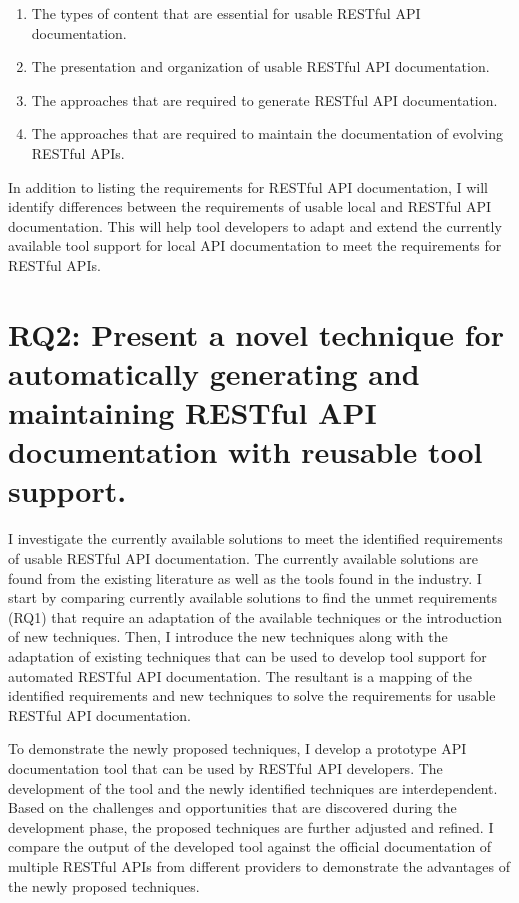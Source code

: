 \documentclass[11pt,oneside]{book}
\begin{document}
\begin{enumerate}
\item The types of content that are essential for usable RESTful API documentation.
\item The presentation and organization of usable RESTful API documentation.
\item The approaches that are required to generate RESTful API documentation.
\item The approaches that are required to maintain the documentation of evolving RESTful APIs.
\end{enumerate}

In addition to listing the requirements for RESTful API documentation, I will identify differences between the requirements of usable local and RESTful API documentation. This will help tool developers to adapt and extend the currently available tool support for local API documentation to meet the requirements for RESTful APIs.

\section{RQ2: Present a novel technique for automatically generating and maintaining RESTful API documentation with reusable tool support.}

I investigate the currently available solutions to meet the identified requirements of usable RESTful API documentation. The currently available solutions are found from the existing literature as well as the tools found in the industry. I start by comparing currently available solutions to find the unmet requirements (RQ1) that require an adaptation of the available techniques or the introduction of new techniques. Then, I introduce the new techniques along with the adaptation of existing techniques that can be used to develop tool support for automated RESTful API documentation. The resultant is a mapping of the identified requirements and new techniques to solve the requirements for usable RESTful API documentation.

To demonstrate the newly proposed techniques, I develop a prototype API documentation tool that can be used by RESTful API developers. The development of the tool and the newly identified techniques are interdependent. Based on the challenges and opportunities that are discovered during the development phase, the proposed techniques are further adjusted and refined. I compare the output of the developed tool against the official documentation of multiple RESTful APIs from different providers to demonstrate the advantages of the newly proposed techniques.
\end{document}
